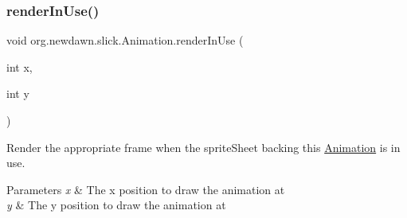 \subsubsection{\texorpdfstring{render\+In\+Use()}{renderInUse()}}
{\footnotesize\ttfamily void org.\+newdawn.\+slick.\+Animation.\+render\+In\+Use (\begin{DoxyParamCaption}\item[{int}]{x,  }\item[{int}]{y }\end{DoxyParamCaption})\hspace{0.3cm}{\ttfamily [inline]}}

Render the appropriate frame when the sprite\+Sheet backing this \mbox{\hyperlink{classorg_1_1newdawn_1_1slick_1_1_animation}{Animation}} is in use. 
\begin{DoxyParams}{Parameters}
{\em x} & The x position to draw the animation at \\
\hline
{\em y} & The y position to draw the animation at \\
\hline
\end{DoxyParams}

